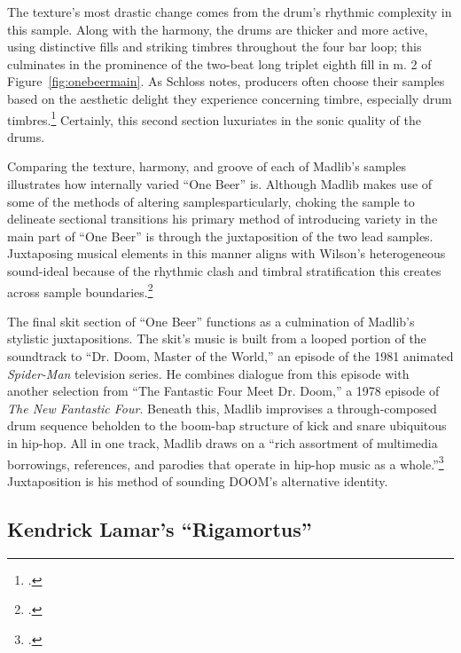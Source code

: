 The texture's most drastic change comes from the drum's rhythmic complexity in this sample.
Along with the harmony, the drums are thicker and more active, using distinctive fills and 
striking timbres throughout the four bar loop; this culminates in the prominence of the 
two-beat long triplet eighth fill in m. 2 of Figure~\ref{fig:onebeermain}. As Schloss notes,
producers often choose their samples based on the aesthetic delight they experience concerning
timbre, especially drum timbres.\footnote{
    \autocite[141--143]{josephgschlossMakingBeatsArt2004}.} 
Certainly, this second section luxuriates in the sonic quality of the drums.

Comparing the texture, harmony, and groove of each of Madlib's samples illustrates how internally
varied ``One Beer'' is. Although Madlib makes use of some of the methods of altering 
samples\textemdash particularly, choking the sample to delineate sectional transitions\textemdash
his primary method of introducing variety in the main part of ``One Beer'' is through the 
juxtaposition of the two lead samples. Juxtaposing musical elements in this manner aligns with 
Wilson's heterogeneous sound-ideal because of the rhythmic clash and timbral stratification
this creates across sample boundaries.\footnote{
    \autocite[329--329]{ollywilsonHeterogeneousSoundIdeal1992}.}

The final skit section of ``One Beer'' functions as a culmination of Madlib's stylistic 
juxtapositions. The skit's music is built from a looped portion of the soundtrack to ``Dr. Doom,
Master of the World,''  an episode of the 1981 animated \textit{Spider-Man} television series. He
combines dialogue from this episode with another selection from ``The Fantastic Four Meet Dr. 
Doom,'' a 1978 episode of \textit{The New Fantastic Four}. Beneath this, Madlib improvises a 
through-composed drum sequence beholden to the boom-bap structure of kick and snare ubiquitous
in hip-hop. All in one track, Madlib draws on a ``rich assortment of multimedia borrowings, 
references, and parodies that operate in hip-hop music as a whole.''\footnote{
    \autocite[42]{joannademersSampling1970sHipHop2003}.} 
Juxtaposition is his method  of sounding DOOM's alternative identity.

\subsection*{\centering Kendrick Lamar's ``Rigamortus''}

